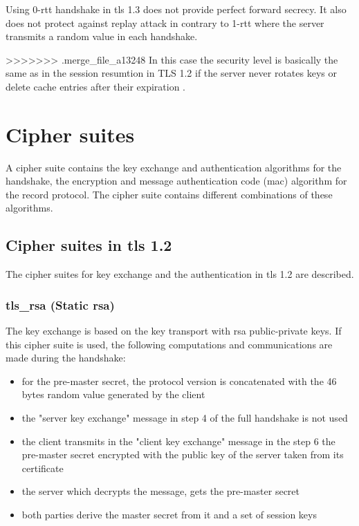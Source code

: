 Using 0-\gls{rtt} handshake in \gls{tls} 1.3 does not provide perfect forward secrecy. It also does not protect against replay attack in contrary to 1-\gls{rtt} where the server transmits a random value in each handshake.

>>>>>>> .merge_file_a13248
\cite{recorla}
In this case the security level is basically the same as in the session resumtion in TLS 1.2 if the server never rotates keys or delete cache entries after their expiration \cite{taubert}.

\section{Cipher suites}
\label{sec:comparison_ciphersuits}

A cipher suite contains the key exchange and authentication algorithms for the handshake, the encryption and message authentication code (\gls{mac}) algorithm for the record protocol. The cipher suite contains different combinations of these algorithms.

\subsection{Cipher suites in \gls{tls} 1.2}
\label{subsec:ciphersuits1_2}

The cipher suites for key exchange and the authentication in \gls{tls} 1.2 are described.

\subsubsection*{\gls{tls}\_\gls{rsa} (Static \gls{rsa})} 
The key exchange is based on the key transport with \gls{rsa} public-private keys.
If this cipher suite is used, the following computations and communications are made during the handshake:
\begin{itemize}
	\item for the pre-master secret, the protocol version is concatenated with the 46 bytes random value generated by the client
	\item the "server key exchange" message in step 4 of the full handshake is not used
	\item the client transmits in the "client key exchange" message in the step 6 the pre-master secret encrypted with the public key of the server taken from its certificate
	\item the server which decrypts the message, gets the pre-master secret 
	\item both parties derive the master secret from it and a set of session keys
\end{itemize}

